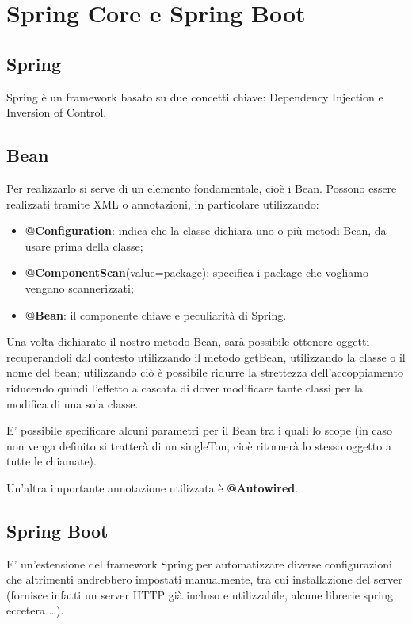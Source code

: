 \chapter{Spring Core e Spring Boot}
\section{Spring}
Spring è un framework basato su due concetti chiave: Dependency Injection e Inversion of Control.

\section{Bean}
Per realizzarlo si serve di un elemento fondamentale, cioè i Bean. Possono essere realizzati tramite XML o annotazioni, in particolare utilizzando:

\begin{itemize}
    \item \textbf{@Configuration}: indica che la classe dichiara uno o più metodi Bean, da usare prima della classe;
    \item \textbf{@ComponentScan}(value=package): specifica i package che vogliamo vengano scannerizzati;
    \item \textbf{@Bean}: il componente chiave e peculiarità di Spring.
\end{itemize}

Una volta dichiarato il nostro metodo Bean, sarà possibile ottenere oggetti recuperandoli dal contesto utilizzando il metodo getBean, utilizzando la classe o il nome del bean; utilizzando ciò è possibile ridurre la strettezza dell'accoppiamento riducendo quindi l'effetto a cascata di dover modificare tante classi per la modifica di una sola classe.

E' possibile specificare alcuni parametri per il Bean tra i quali lo scope (in caso non venga definito si tratterà di un singleTon, cioè ritornerà lo stesso oggetto a tutte le chiamate).

Un'altra importante annotazione utilizzata è \textbf{@Autowired}.

\section{Spring Boot}
E' un'estensione del framework Spring per automatizzare diverse configurazioni che altrimenti andrebbero impostati manualmente, tra cui installazione del server (fornisce infatti un server HTTP già incluso e utilizzabile, alcune librerie spring eccetera \dots).
